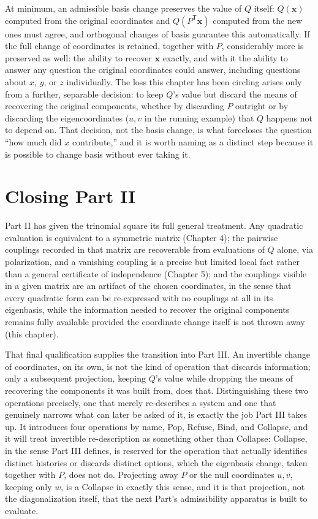 \documentclass[11pt]{book}
\begin{document}
At minimum, an admissible basis change preserves the value of $Q$ itself: $Q(\mathbf{x})$ computed from the original coordinates and $Q(P^{\mathsf T}\mathbf{x})$ computed from the new ones must agree, and orthogonal changes of basis guarantee this automatically. If the full change of coordinates is retained, together with $P$, considerably more is preserved as well: the ability to recover $\mathbf{x}$ exactly, and with it the ability to answer any question the original coordinates could answer, including questions about $x$, $y$, or $z$ individually. The loss this chapter has been circling arises only from a further, separable decision: to keep $Q$'s value but discard the means of recovering the original components, whether by discarding $P$ outright or by discarding the eigencoordinates ($u,v$ in the running example) that $Q$ happens not to depend on. That decision, not the basis change, is what forecloses the question ``how much did $x$ contribute,'' and it is worth naming as a distinct step because it is possible to change basis without ever taking it.

\section{Closing Part II}

Part II has given the trinomial square its full general treatment. Any quadratic evaluation is equivalent to a symmetric matrix (Chapter 4); the pairwise couplings recorded in that matrix are recoverable from evaluations of $Q$ alone, via polarization, and a vanishing coupling is a precise but limited local fact rather than a general certificate of independence (Chapter 5); and the couplings visible in a given matrix are an artifact of the chosen coordinates, in the sense that every quadratic form can be re-expressed with no couplings at all in its eigenbasis, while the information needed to recover the original components remains fully available provided the coordinate change itself is not thrown away (this chapter).

That final qualification supplies the transition into Part III. An invertible change of coordinates, on its own, is not the kind of operation that discards information; only a subsequent projection, keeping $Q$'s value while dropping the means of recovering the components it was built from, does that. Distinguishing these two operations precisely, one that merely re-describes a system and one that genuinely narrows what can later be asked of it, is exactly the job Part III takes up. It introduces four operations by name, Pop, Refuse, Bind, and Collapse, and it will treat invertible re-description as something other than Collapse: Collapse, in the sense Part III defines, is reserved for the operation that actually identifies distinct histories or discards distinct options, which the eigenbasis change, taken together with $P$, does not do. Projecting away $P$ or the null coordinates $u,v$, keeping only $w$, is a Collapse in exactly this sense, and it is that projection, not the diagonalization itself, that the next Part's admissibility apparatus is built to evaluate.
\end{document}
